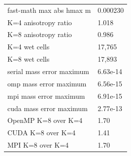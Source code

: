 \begin{tabular}{ll}
fast-math max abs hmax m & 0.000230 \\
K=4 anisotropy ratio & 1.018 \\
K=8 anisotropy ratio & 0.986 \\
K=4 wet cells & 17,765 \\
K=8 wet cells & 17,893 \\
serial mass error maximum & 6.63e-14 \\
omp mass error maximum & 6.56e-15 \\
mpi mass error maximum & 6.91e-15 \\
cuda mass error maximum & 2.77e-13 \\
OpenMP K=8 over K=4 & 1.70 \\
CUDA K=8 over K=4 & 1.41 \\
MPI K=8 over K=4 & 1.70 \\
\end{tabular}
